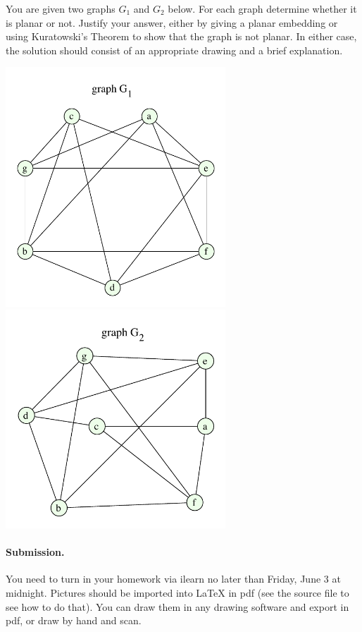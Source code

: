 \documentclass{article}
\begin{document}

\vfill
\eject

\begin{problem}
You are given two graphs $G_1$ and $G_2$ below. For each
graph determine whether it is planar or not.
Justify your answer, either by giving a planar embedding or using
Kuratowski's Theorem to show that the graph is not planar.
In either case, the solution should consist of an
appropriate drawing and a brief explanation.

\begin{center}
	\includegraphics[width = 3.25in]{planar_graphG1_hw5.pdf}
	\\
	\includegraphics[width = 3.25in]{planar_graphG2_hw5.pdf}
\end{center}

\end{problem}




\vskip 0.1in
\paragraph{Submission.}
You need to turn in your homework via ilearn no later than
Friday, June 3 at midnight. Pictures should be 
imported into {\LaTeX} in pdf (see the source file to see
how to do that). You can draw them in any drawing
software and export in pdf, or draw by hand and scan.
\end{document}
